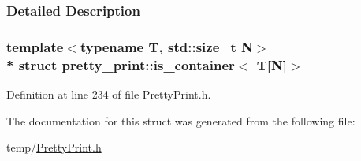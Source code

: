 \subsubsection{Detailed Description}
\subsubsection*{template$<$typename T, std\+::size\+\_\+t N$>$\\*
struct pretty\+\_\+print\+::is\+\_\+container$<$ T\mbox{[}\+N\mbox{]}$>$}



Definition at line 234 of file Pretty\+Print.\+h.



The documentation for this struct was generated from the following file\+:\begin{DoxyCompactItemize}
\item 
temp/\hyperlink{PrettyPrint_8h}{Pretty\+Print.\+h}\end{DoxyCompactItemize}
